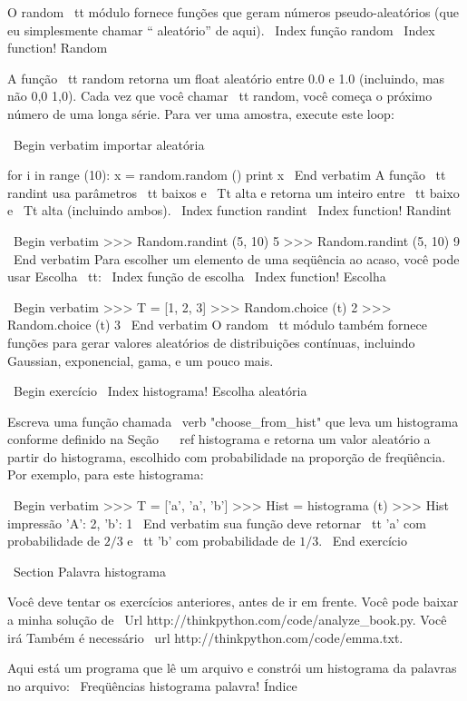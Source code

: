 \documentclass[10pt]{book}
\begin{document}
\begin {itemize}
{{{{{{{{{O {random \ tt} módulo fornece funções que geram
números pseudo-aleatórios (que eu simplesmente chamar `` aleatório'' de
aqui).
\ Index {função random}
\ Index {function! Random}

A função {\ tt random} retorna um float aleatório
entre 0.0 e 1.0 (incluindo, mas não 0,0 1,0). Cada vez que você
chamar {\ tt random}, você começa o próximo número de uma longa série. Para ver uma
amostra, execute este loop:

\ Begin {verbatim}
importar aleatória

for i in range (10):
    x = random.random ()
    print x
\ End {verbatim}
%
A função {\ tt randint} usa parâmetros {\ tt baixos} e
{\ Tt alta} e retorna um inteiro entre {\ tt baixo} e
{\ Tt alta} (incluindo ambos).
\ Index {function randint}
\ Index {function! Randint}

\ Begin {verbatim}
>>> Random.randint (5, 10)
5
>>> Random.randint (5, 10)
9
\ End {verbatim}
%
Para escolher um elemento de uma seqüência ao acaso, você pode usar
{Escolha \ tt}:
\ Index {função de escolha}
\ Index {function! Escolha}

\ Begin {verbatim}
>>> T = [1, 2, 3]
>>> Random.choice (t)
2
>>> Random.choice (t)
3
\ End {verbatim}
%
O {random \ tt} módulo também fornece funções para gerar
valores aleatórios de distribuições contínuas, incluindo
Gaussian, exponencial, gama, e um pouco mais.

\ Begin {} exercício
\ Index {histograma! Escolha aleatória}

Escreva uma função chamada \ verb "choose_from_hist" que leva
um histograma conforme definido na Seção ~ \ ref {} histograma e retorna um 
valor aleatório a partir do histograma, escolhido com probabilidade
na proporção de freqüência. Por exemplo, para este histograma:

\ Begin {verbatim}
>>> T = ['a', 'a', 'b']
>>> Hist = histograma (t)
>>> Hist impressão
{'A': 2, 'b': 1}
\ End {verbatim}
%
sua função deve retornar {\ tt 'a'} com probabilidade de $ 2/3 $ e {\ tt 'b'}
com probabilidade de $ 1/3 $.
\ End {} exercício


\ Section {Palavra histograma}

Você deve tentar os exercícios anteriores, antes de ir em frente.
Você pode baixar a minha solução de
 \ Url {http://thinkpython.com/code/analyze_book.py}. Você irá
Também é necessário \ url {http://thinkpython.com/code/emma.txt}.

Aqui está um programa que lê um arquivo e constrói um histograma da
palavras no arquivo:
\ {Freqüências histograma palavra!} Índice

}}}}}}}}}
\end{itemize}
\end{document}
